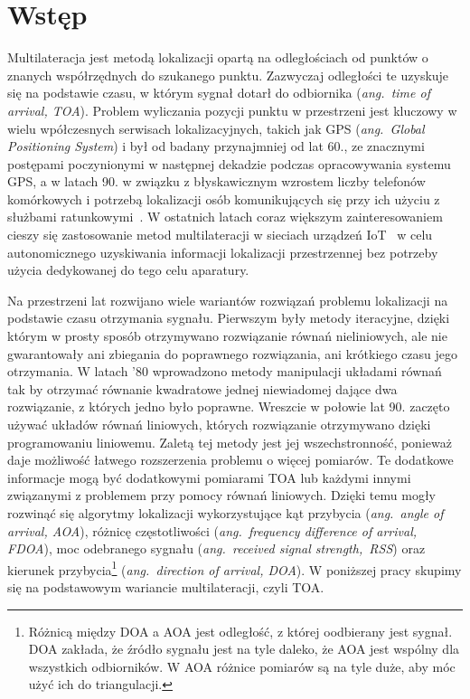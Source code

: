 \chapter*{Wstęp}\label{chap:introduction}

Multilateracja jest metodą lokalizacji opartą na odległościach od punktów o znanych współrzędnych do szukanego punktu. Zazwyczaj odległości te uzyskuje się na podstawie czasu, w którym sygnał dotarł do odbiornika (\textit{ang.\ time of arrival, TOA}). Problem wyliczania pozycji punktu w przestrzeni jest kluczowy w wielu wpółczesnych serwisach lokalizacyjnych, takich jak GPS (\textit{ang.\ Global Positioning System}) i był od badany przynajmniej od lat 60., ze znacznymi postępami poczynionymi w następnej dekadzie podczas opracowywania systemu GPS, a w latach 90. w związku z błyskawicznym wzrostem liczby telefonów komórkowych i potrzebą lokalizacji osób komunikujących się przy ich użyciu z służbami ratunkowymi~\cite{govinfo}. W ostatnich latach coraz większym zainteresowaniem cieszy się zastosowanie metod multilateracji w sieciach urządzeń IoT~\cite{9184896} w celu autonomicznego uzyskiwania informacji lokalizacji przestrzennej bez potrzeby użycia dedykowanej do tego celu aparatury.

Na przestrzeni lat rozwijano wiele wariantów rozwiązań problemu lokalizacji na podstawie czasu otrzymania sygnału. Pierwszym były metody iteracyjne, dzięki którym w prosty sposób otrzymywano rozwiązanie równań nieliniowych, ale nie gwarantowały ani zbiegania do poprawnego rozwiązania, ani krótkiego czasu jego otrzymania. W latach '80 wprowadzono metody manipulacji układami równań tak by otrzymać równanie kwadratowe jednej niewiadomej dające dwa rozwiązanie, z których jedno było poprawne. Wreszcie w połowie lat 90. zaczęto używać układów równań liniowych, których rozwiązanie otrzymywano dzięki programowaniu liniowemu. Zaletą tej metody jest jej wszechstronność, ponieważ daje możliwość łatwego rozszerzenia problemu o więcej pomiarów. Te dodatkowe informacje mogą być dodatkowymi  pomiarami TOA lub każdymi innymi związanymi z problemem przy pomocy równań liniowych. Dzięki temu mogły rozwinąć się algorytmy lokalizacji wykorzystujące kąt przybycia (\textit{ang.\ angle of arrival, AOA}), różnicę częstotliwości (\textit{ang.\ frequency difference of arrival, FDOA}), moc odebranego sygnału (\textit{ang.\ received signal strength,\ RSS}) oraz kierunek przybycia\footnote{Różnicą między DOA a AOA jest odległość, z której oodbierany jest sygnał. DOA zakłada, że źródło sygnału jest na tyle daleko, że AOA jest wspólny dla wszystkich odbiorników. W AOA różnice pomiarów są na tyle duże, aby móc użyć ich do triangulacji.} (\textit{ang.\ direction of arrival, DOA}). W poniższej pracy skupimy się na podstawowym wariancie multilateracji, czyli TOA.

